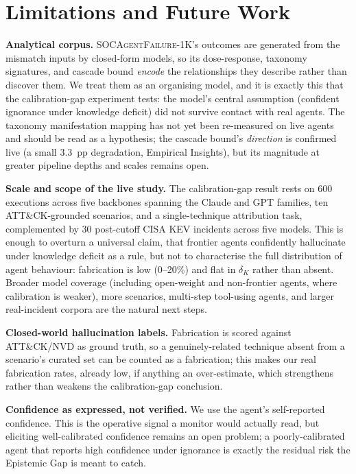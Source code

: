 \documentclass[journal,compsoc]{IEEEtran}
\newcommand{\SAFK}{\textsc{SOCAgentFailure-1K}}
\begin{document}
\section{Limitations and Future Work}

\textbf{Analytical corpus.} \SAFK{}'s outcomes are generated from the
mismatch inputs by closed-form models, so its dose-response, taxonomy
signatures, and cascade bound \textit{encode} the relationships they
describe rather than discover them. We treat them as an organising
model, and it is exactly this that the calibration-gap experiment tests:
the model's central assumption (confident ignorance under knowledge
deficit) did not survive contact with real agents. The taxonomy
manifestation mapping has not yet been re-measured on live agents and
should be read as a hypothesis; the cascade bound's \emph{direction} is
confirmed live (a small $3.3$~pp degradation, Empirical Insights), but its magnitude at
greater pipeline depths and scales remains open.

\textbf{Scale and scope of the live study.} The calibration-gap result
rests on 600 executions across five backbones spanning the Claude and GPT families, ten
ATT\&CK-grounded scenarios, and a single-technique attribution task,
complemented by 30 post-cutoff CISA KEV incidents across five models.
This is enough to overturn a universal claim, that frontier agents
confidently hallucinate under knowledge deficit as a rule, but not to
characterise the full distribution of agent behaviour: fabrication is
low (0--20\%) and flat in $\delta_K$ rather than absent. Broader model
coverage (including open-weight and non-frontier agents, where
calibration is weaker), more scenarios, multi-step tool-using agents,
and larger real-incident corpora are the natural next steps.

\textbf{Closed-world hallucination labels.} Fabrication is scored
against ATT\&CK/NVD as ground truth, so a genuinely-related technique
absent from a scenario's curated set can be counted as a fabrication;
this makes our real fabrication rates, already low, if anything an
over-estimate, which strengthens rather than weakens the calibration-gap
conclusion.

\textbf{Confidence as expressed, not verified.} We use the agent's
self-reported confidence. This is the operative signal a monitor would
actually read, but eliciting well-calibrated confidence remains an open
problem; a poorly-calibrated agent that reports high confidence under
ignorance is exactly the residual risk the Epistemic Gap is meant to
catch.
\end{document}

